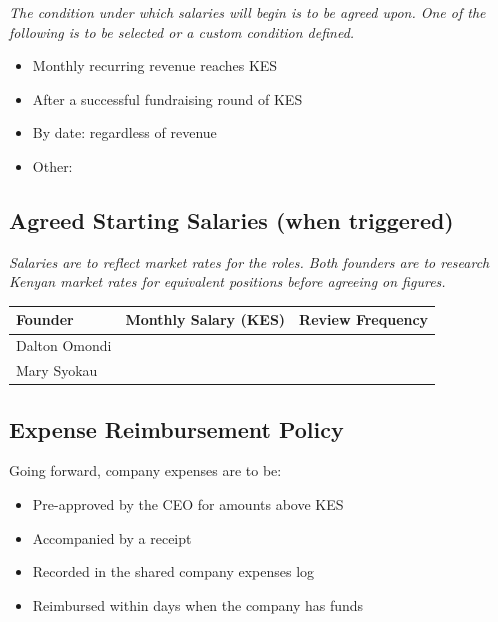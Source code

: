 \documentclass[12pt,a4paper]{article}
\newcommand{\blank}[1][5.5cm]{\underline{\hspace{#1}}}
\newcommand{\cb}{$\square$\;}                   %
\begin{document}
\begin{notebox}
\textit{The condition under which salaries will begin is to be agreed upon. One of the following is to be selected or a custom condition defined.}
\end{notebox}

\begin{itemize}[label=\cb]
  \item Monthly recurring revenue reaches KES \blank[3.5cm]
  \item After a successful fundraising round of KES \blank[3.5cm]
  \item By date: \blank[3cm] regardless of revenue
  \item Other: \blank[7cm]
\end{itemize}

\subsection{Agreed Starting Salaries (when triggered)}

\begin{notebox}
\textit{Salaries are to reflect market rates for the roles. Both founders are to research Kenyan market rates for equivalent positions before agreeing on figures.}
\end{notebox}

\begin{tabularx}{\linewidth}{L{3.5cm} X X}
  \toprule
  \textbf{Founder} & \textbf{Monthly Salary (KES)} & \textbf{Review Frequency} \\
  \midrule
  Dalton Omondi & \blank[4cm] & \blank[4cm] \\[0.4em]
  Mary Syokau   & \blank[4cm] & \blank[4cm] \\
  \bottomrule
\end{tabularx}

\subsection{Expense Reimbursement Policy}

Going forward, company expenses are to be:
\begin{itemize}
  \item Pre-approved by the CEO for amounts above KES \blank[3cm]
  \item Accompanied by a receipt
  \item Recorded in the shared company expenses log
  \item Reimbursed within \blank[1.5cm] days when the company has funds
\end{itemize}
\end{document}
